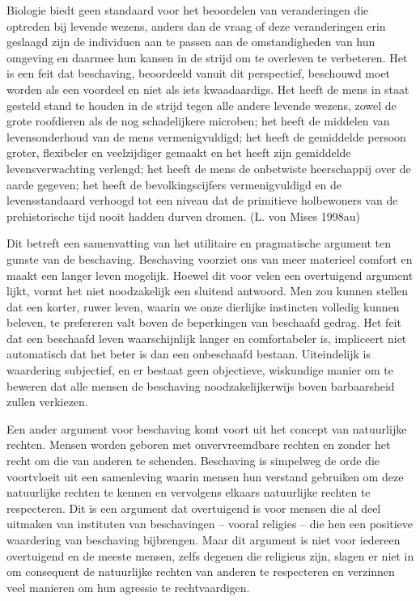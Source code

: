\documentclass[
  a5paper,
  smalldemyvopaper,11pt,twoside,onecolumn,openright,extrafontsizes,
hidelinks]{memoir}
\begin{document}
Biologie biedt geen standaard voor het beoordelen van veranderingen die
optreden bij levende wezens, anders dan de vraag of deze veranderingen
erin geslaagd zijn de individuen aan te passen aan de omstandigheden van
hun omgeving en daarmee hun kansen in de strijd om te overleven te
verbeteren. Het is een feit dat beschaving, beoordeeld vanuit dit
perspectief, beschouwd moet worden als een voordeel en niet als iets
kwaadaardigs. Het heeft de mens in staat gesteld stand te houden in de
strijd tegen alle andere levende wezens, zowel de grote roofdieren als
de nog schadelijkere microben; het heeft de middelen van levensonderhoud
van de mens vermenigvuldigd; het heeft de gemiddelde persoon groter,
flexibeler en veelzijdiger gemaakt en het heeft zijn gemiddelde
levensverwachting verlengd; het heeft de mens de onbetwiste heerschappij
over de aarde gegeven; het heeft de bevolkingscijfers vermenigvuldigd en
de levensstandaard verhoogd tot een niveau dat de primitieve holbewoners
van de prehistorische tijd nooit hadden durven dromen. (L. von Mises
1998au)

Dit betreft een samenvatting van het utilitaire en pragmatische argument
ten gunste van de beschaving. Beschaving voorziet ons van meer materieel
comfort en maakt een langer leven mogelijk. Hoewel dit voor velen een
overtuigend argument lijkt, vormt het niet noodzakelijk een sluitend
antwoord. Men zou kunnen stellen dat een korter, ruwer leven, waarin we
onze dierlijke instincten volledig kunnen beleven, te prefereren valt
boven de beperkingen van beschaafd gedrag. Het feit dat een beschaafd
leven waarschijnlijk langer en comfortabeler is, impliceert niet
automatisch dat het beter is dan een onbeschaafd bestaan. Uiteindelijk
is waardering subjectief, en er bestaat geen objectieve, wiskundige
manier om te beweren dat alle mensen de beschaving noodzakelijkerwijs
boven barbaarsheid zullen verkiezen.

Een ander argument voor beschaving komt voort uit het concept van
natuurlijke rechten. Mensen worden geboren met onvervreemdbare rechten
en zonder het recht om die van anderen te schenden. Beschaving is
simpelweg de orde die voortvloeit uit een samenleving waarin mensen hun
verstand gebruiken om deze natuurlijke rechten te kennen en vervolgens
elkaars natuurlijke rechten te respecteren. Dit is een argument dat
overtuigend is voor mensen die al deel uitmaken van instituten van
beschavingen -- vooral religies -- die hen een positieve waardering van
beschaving bijbrengen. Maar dit argument is niet voor iedereen
overtuigend en de meeste mensen, zelfs degenen die religieus zijn,
slagen er niet in om consequent de natuurlijke rechten van anderen te
respecteren en verzinnen veel manieren om hun agressie te
rechtvaardigen.
\end{document}

